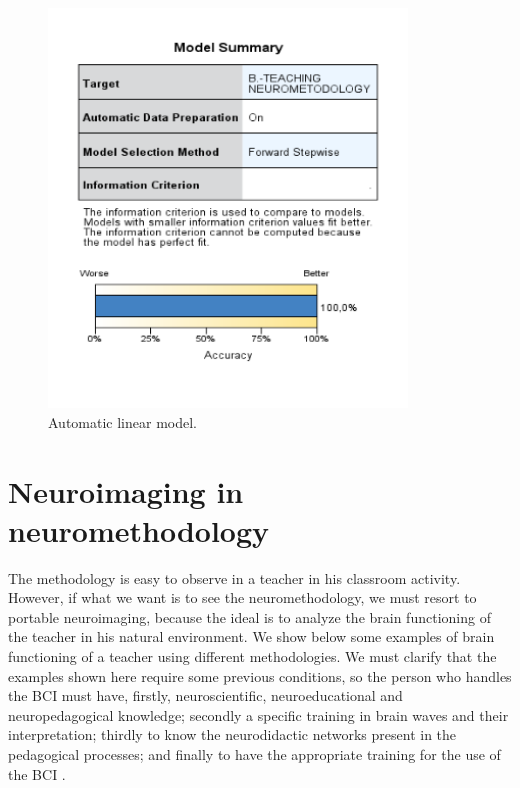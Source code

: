 \documentclass[english]{textolivre}
\begin{document}
\begin{figure}[h!]
 \centering
 \includegraphics[width=0.85\textwidth]{fig1.png}
 \caption{Automatic linear model.}
 \label{fig01}
\end{figure}

\section{Neuroimaging in neuromethodology}\label{sec-fmt-manuscrito}
The methodology is easy to observe in a teacher in his classroom activity. However, if what we want is to see the neuromethodology, we must resort to portable neuroimaging, because the ideal is to analyze the brain functioning of the teacher in his natural environment. We show below some examples of brain functioning of a teacher using different methodologies. We must clarify that the examples shown here require some previous conditions, so the person who handles the BCI must have, firstly, neuroscientific, neuroeducational and neuropedagogical  knowledge; secondly a specific training in brain waves and their interpretation; thirdly to know the neurodidactic networks present in the pedagogical processes; and finally to have the appropriate training for the use of the BCI \cite{hernandez_neuroimagen_2022}. 
\end{document}
